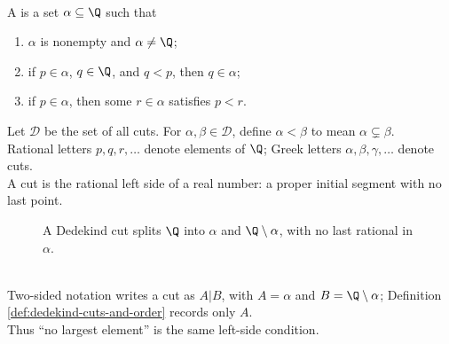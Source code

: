 \begin{definition} \label{def:dedekind-cuts-and-order} \\
A  is a set $\alpha\subseteq\Q$ such that
\begin{enumerate}[label=(\roman*)]
\setlength{\itemsep}{0pt}
\item $\alpha$ is nonempty and $\alpha\neq\Q$;
\item if $p\in\alpha$, $q\in\Q$, and $q<p$, then $q\in\alpha$;
\item if $p\in\alpha$, then some $r\in\alpha$ satisfies $p<r$.
\end{enumerate}
Let $\mathscr{D}$ be the set of all cuts. For $\alpha,\beta\in\mathscr{D}$, define $\alpha<\beta$ to mean $\alpha\subsetneq\beta$.\\
Rational letters $p,q,r,\ldots$ denote elements of $\Q$; Greek letters $\alpha,\beta,\gamma,\ldots$ denote cuts.\\
A cut is the rational left side of a real number: a proper initial segment with no last point.
\end{definition}

\begin{figure}[H]
  \centering
  
  \caption{A Dedekind cut splits $\Q$ into $\alpha$ and $\Q\setminus\alpha$, with no last rational in $\alpha$.}
  \label{fig:dedekind-cut-left-right-parts}
\end{figure}
 
\begin{remark} \label{rem:left-cut-versus-two-sided-cut} \\
Two-sided notation writes a cut as $A|B$, with $A=\alpha$ and $B=\Q\setminus\alpha$; Definition \ref{def:dedekind-cuts-and-order} records only $A$.\\
Thus ``no largest element'' is the same left-side condition.
\end{remark}

